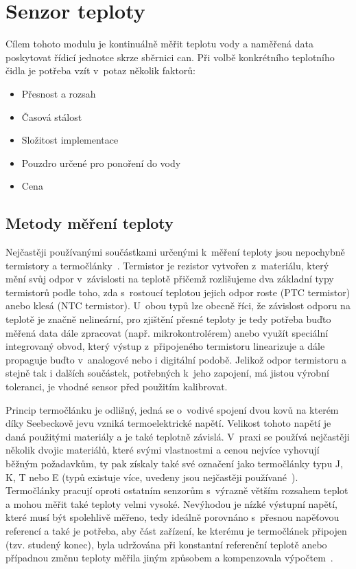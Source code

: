 \section{Senzor teploty}
\label{sec:perif-sensor-teploty}
    Cílem tohoto modulu je kontinuálně měřit teplotu vody a naměřená data poskytovat řídicí jednotce skrze sběrnici \acs{can}. Při volbě konkrétního teplotního čidla je potřeba vzít v~potaz několik faktorů:
    \begin{itemize}
        \item Přesnost a rozsah
        \item Časová stálost
        \item Složitost implementace 
        \item Pouzdro určené pro ponoření do vody
        \item Cena
    \end{itemize}

    \subsection{Metody měření teploty}
        Nejčastěji používanými součástkami určenými k~měření teploty jsou nepochybně termistory a termočlánky~\cite{allaboutcircuits2023tempsensors}. Termistor je rezistor vytvořen z~materiálu, který mění svůj odpor v~závislosti na teplotě přičemž rozlišujeme dva základní typy termistorů podle toho, zda s~rostoucí teplotou jejich odpor roste (PTC termistor) anebo klesá (NTC termistor). U~obou typů lze obecně říci, že závislost odporu na teplotě je značně nelineární, pro zjištění přesné teploty je tedy potřeba buďto měřená data dále zpracovat (např. mikrokontrolérem) anebo využít speciální integrovaný obvod, který výstup z~připojeného termistoru linearizuje a dále propaguje buďto v~analogové nebo i digitální podobě. Jelikož odpor termistoru a stejně tak i dalších součástek, potřebných k~jeho zapojení, má jistou výrobní toleranci, je vhodné sensor před použitím kalibrovat.

        Princip termočlánku je odlišný, jedná se o~vodivé spojení dvou kovů na kterém díky Seebeckově jevu vzniká termoelektrické napětí. Velikost tohoto napětí je daná použitými materiály a je také teplotně závislá. V~praxi se používá nejčastěji několik dvojic materiálů, které svými vlastnostmi a cenou nejvíce vyhovují běžným požadavkům, ty pak získaly také své označení jako termočlánky typu J, K, T nebo E (typů existuje více, uvedeny jsou nejčastěji používané~\cite{TechieScience_Thermocouples}). Termočlánky pracují oproti ostatním senzorům s~výrazně větším rozsahem teplot a mohou měřit také teploty velmi vysoké. Nevýhodou je nízké výstupní napětí, které musí být spolehlivě měřeno, tedy ideálně porovnáno s~přesnou napěťovou referencí a také je potřeba, aby část zařízení, ke kterému je termočlánek připojen (tzv. studený konec), byla udržována při konstantní referenční teplotě anebo případnou změnu teploty měřila jiným způsobem a kompenzovala výpočtem~\cite{allaboutcircuits2023tempsensors,TechieScience_Thermocouples}.

